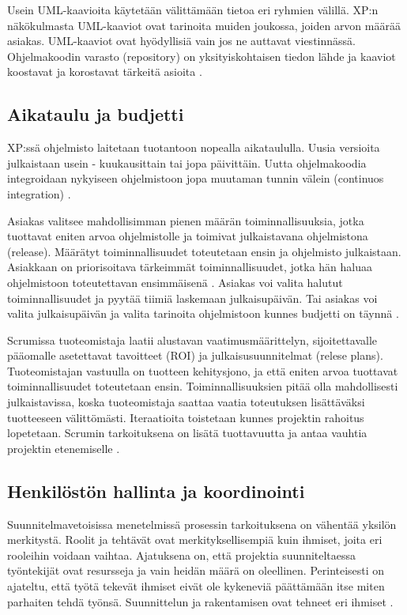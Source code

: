 \documentclass[finnish]{tktltiki2}
\theoremstyle{definition}
\theoremstyle{remark}
\begin{document}
Usein UML-kaavioita käytetään välittämään tietoa eri ryhmien välillä. XP:n näkökulmasta UML-kaaviot ovat tarinoita muiden joukossa, joiden arvon määrää asiakas. UML-kaaviot ovat hyödyllisiä vain jos ne auttavat viestinnässä. Ohjelmakoodin varasto (repository) on yksityiskohtaisen tiedon lähde ja kaaviot koostavat ja korostavat tärkeitä asioita \cite{FOW01b}.

\subsection{Aikataulu ja budjetti}

XP:ssä ohjelmisto laitetaan tuotantoon nopealla aikataululla. Uusia versioita julkaistaan usein - kuukausittain tai jopa päivittäin. Uutta ohjelmakoodia integroidaan nykyiseen ohjelmistoon jopa muutaman tunnin välein (continuos integration) \cite{BEC99}.  

Asiakas valitsee mahdollisimman pienen määrän toiminnallisuuksia, jotka tuottavat eniten arvoa ohjelmistolle ja toimivat julkaistavana ohjelmistona (release). Määrätyt toiminnallisuudet toteutetaan ensin ja ohjelmisto julkaistaan. Asiakkaan on priorisoitava tärkeimmät toiminnallisuudet, jotka hän haluaa ohjelmistoon toteutettavan ensimmäisenä \cite{BEC99}. Asiakas voi valita halutut toiminnallisuudet ja pyytää tiimiä laskemaan julkaisupäivän. Tai asiakas voi valita julkaisupäivän ja valita tarinoita ohjelmistoon kunnes budjetti on täynnä \cite{BEC99}.

Scrumissa tuoteomistaja laatii alustavan vaatimusmäärittelyn, sijoitettavalle pääomalle asetettavat tavoitteet (ROI) ja julkaisusuunnitelmat (relese plans). Tuoteomistajan vastuulla on tuotteen kehitysjono, ja että eniten arvoa tuottavat toiminnallisuudet toteutetaan ensin. Toiminnallisuuksien pitää olla mahdollisesti julkaistavissa, koska tuoteomistaja saattaa vaatia toteutuksen lisättäväksi tuotteeseen välittömästi. Iteraatioita toistetaan kunnes projektin rahoitus lopetetaan. Scrumin tarkoituksena on lisätä tuottavuutta ja antaa vauhtia projektin etenemiselle \cite{SCH09}.

\subsection{Henkilöstön hallinta ja koordinointi}

Suunnitelmavetoisissa menetelmissä prosessin tarkoituksena on vähentää yksilön merkitystä. Roolit ja tehtävät ovat merkityksellisempiä kuin ihmiset, joita eri rooleihin voidaan vaihtaa. Ajatuksena on, että projektia suunniteltaessa työntekijät ovat resursseja ja vain heidän määrä on oleellinen. Perinteisesti on ajateltu, että työtä tekevät ihmiset eivät ole kykeneviä päättämään itse miten parhaiten tehdä työnsä. Suunnittelun ja rakentamisen ovat tehneet eri ihmiset \cite{FOW01a}. 
\end{document}

